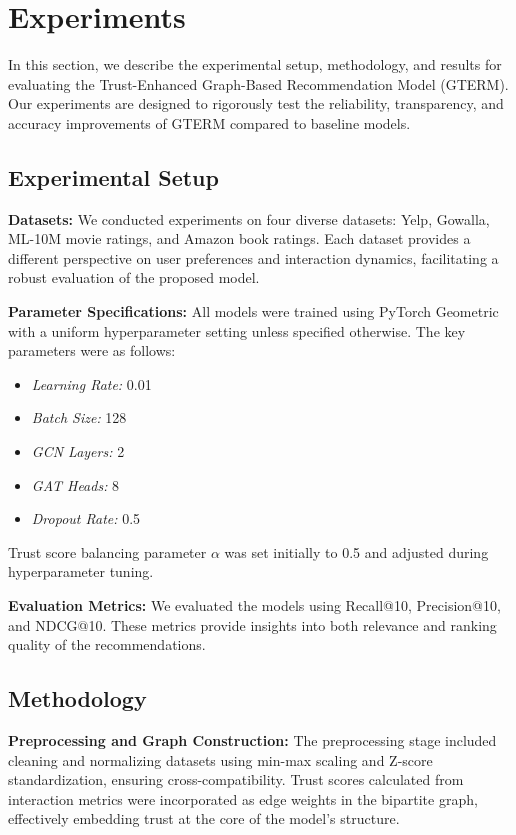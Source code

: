 \section{Experiments}

In this section, we describe the experimental setup, methodology, and results for evaluating the Trust-Enhanced Graph-Based Recommendation Model (GTERM). Our experiments are designed to rigorously test the reliability, transparency, and accuracy improvements of GTERM compared to baseline models.

\subsection{Experimental Setup}

\textbf{Datasets:} We conducted experiments on four diverse datasets: Yelp, Gowalla, ML-10M movie ratings, and Amazon book ratings. Each dataset provides a different perspective on user preferences and interaction dynamics, facilitating a robust evaluation of the proposed model.

\textbf{Parameter Specifications:} All models were trained using PyTorch Geometric with a uniform hyperparameter setting unless specified otherwise. The key parameters were as follows:
\begin{itemize}
    \item \textit{Learning Rate:} 0.01
    \item \textit{Batch Size:} 128
    \item \textit{GCN Layers:} 2
    \item \textit{GAT Heads:} 8
    \item \textit{Dropout Rate:} 0.5
\end{itemize}
Trust score balancing parameter \(\alpha\) was set initially to 0.5 and adjusted during hyperparameter tuning.

\textbf{Evaluation Metrics:} We evaluated the models using Recall@10, Precision@10, and NDCG@10. These metrics provide insights into both relevance and ranking quality of the recommendations.

\subsection{Methodology}

\textbf{Preprocessing and Graph Construction:} The preprocessing stage included cleaning and normalizing datasets using min-max scaling and Z-score standardization, ensuring cross-compatibility. Trust scores calculated from interaction metrics were incorporated as edge weights in the bipartite graph, effectively embedding trust at the core of the model's structure.

